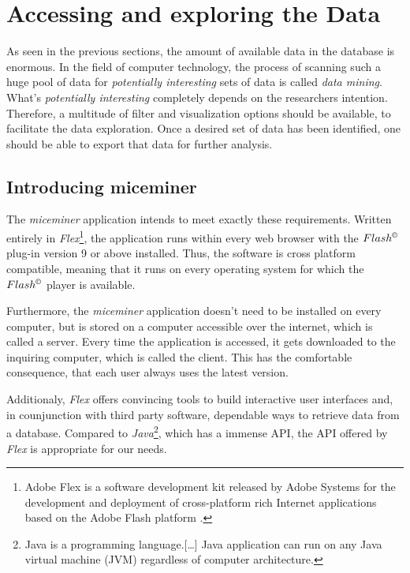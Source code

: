 \newpage
\section{Accessing and exploring the Data }
\label{sec:dataaccessandexp}

As seen in the previous sections, the amount of available data in the database is enormous. In the field of computer technology, the process of scanning such a huge pool of data for \textit{potentially interesting} sets of data is called \textit{data mining}. What's \textit{potentially interesting} completely depends on the researchers intention. Therefore, a multitude of filter and visualization options should be available, to facilitate the data exploration. Once a desired set of data has been identified, one should be able to export that data for further analysis. 

\subsection{Introducing miceminer}
\label{subsec:dataexp}

The \textit{miceminer} application intends to meet exactly these requirements. Written entirely in \textit{Flex}\footnote{Adobe Flex is a software development kit released by Adobe Systems for the development and deployment of cross-platform rich Internet applications based on the Adobe Flash platform \cite{wiki:flex}.}, the application runs within every web browser with the $Flash^{\copyright}$ plug-in version 9 or above installed. Thus, the software is cross platform compatible, meaning that it runs on every operating system for which the $Flash^{\copyright}$ player is available. 

Furthermore, the \textit{miceminer} application doesn't need to be installed on every computer, but is stored on a computer accessible over the internet, which is called a server. Every time the application is accessed, it gets downloaded to the inquiring computer, which is called the client. This has the comfortable consequence, that each user always uses the latest version.

Additionaly, \textit{Flex} offers convincing tools to build interactive user interfaces and, in counjunction with third party software, dependable ways to retrieve data from a database. Compared to \textit{Java}\footnote{Java is a programming language.[\ldots] Java application can run on any Java virtual machine (JVM) regardless of computer architecture\cite{wiki:java}.}, which has a immense \ac{API}, the \ac{API} offered by \textit{Flex} is appropriate for our needs.

